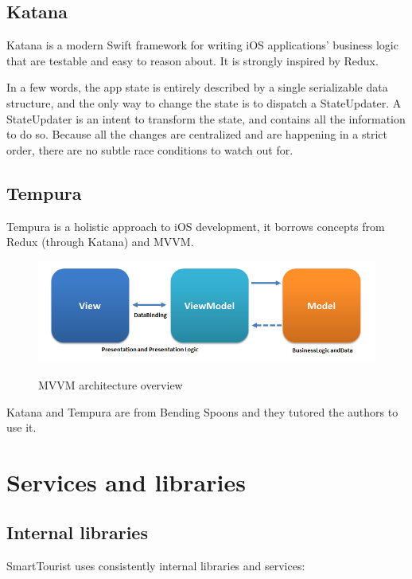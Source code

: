 \documentclass[a4paper, 11pt, parskip=half]{scrreprt}
\theoremstyle{definition}
\newenvironment{info}[1][Info:]{ %
	\medskip
	\begin{mdframed}[style=info]
		\noindent{\textbf{#1}}
}{
	\end{mdframed}
}
\begin{document}
\section{Katana}
Katana is a modern Swift framework for writing iOS applications' business logic that are testable and easy to reason about. It is strongly inspired by Redux.

In a few words, the app state is entirely described by a single serializable data structure, and the only way to change the state is to dispatch a StateUpdater. A StateUpdater is an intent to transform the state, and contains all the information to do so. Because all the changes are centralized and are happening in a strict order, there are no subtle race conditions to watch out for.

\section{Tempura}
Tempura is a holistic approach to iOS development, it borrows concepts from Redux (through Katana) and MVVM.

\begin{figure}[H]
  	\centering
  	\includegraphics[width=0.9\linewidth]{mvvm}
  	\label{fig:test1}
	\caption{MVVM architecture overview}
\end{figure}

\begin{info}
	Katana and Tempura are from Bending Spoons and they tutored the authors to use it.
\end{info}




\chapter{Services and libraries}

\section{Internal libraries}

SmartTourist uses consistently internal libraries and services:
\end{document}
